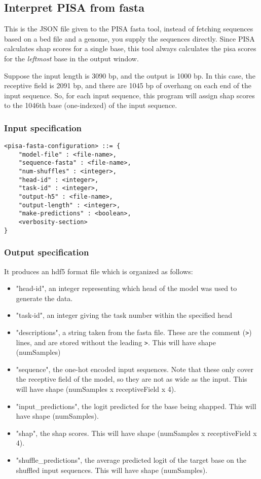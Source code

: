 \documentclass{article}
\begin{document}
\subsection{Interpret PISA from fasta}

This is the JSON file given to the PISA fasta tool, instead of fetching sequences based on a bed file and a genome, you supply the sequences directly. 
Since PISA calculates shap scores for a single base, this tool always calculates the pisa scores for the \emph{leftmost} base in the output window. 

Suppose the input length is 3090 bp, and the output is 1000 bp. 
In this case, the receptive field is 2091 bp, and there are 1045 bp of overhang on each end of the input sequence.
So, for each input sequence, this program will assign shap scores to the 1046th base (one-indexed) of the input sequence. 

\subsubsection{Input specification}
\begin{lstlisting}
<pisa-fasta-configuration> ::= {
    "model-file" : <file-name>,
    "sequence-fasta" : <file-name>,
    "num-shuffles" : <integer>,
    "head-id" : <integer>,
    "task-id" : <integer>,
    "output-h5" : <file-name>,
    "output-length" : <integer>,
    "make-predictions" : <boolean>,
    <verbosity-section>
}
\end{lstlisting}

\subsubsection{Output specification}

It produces an hdf5 format file which is organized as follows:

\begin{itemize}
    \item "head-id", an integer representing which head of the model was used to generate the data.
    \item "task-id", an integer giving the task number within the specified head
    \item "descriptions", a string taken from the fasta file. These are the comment (\texttt{>}) lines, and are stored without the leading \texttt{>}. This will have shape (numSamples)
    \item "sequence", the one-hot encoded input sequences. Note that these only cover the receptive field of the model, so they are not as wide as the input. This will have shape (numSamples x receptiveField x 4).
    \item "input\_predictions", the logit predicted for the base being shapped. This will have shape (numSamples).
    \item "shap", the shap scores. This will have shape (numSamples x receptiveField x 4). 
    \item "shuffle\_predictions", the average predicted logit of the target base on the shuffled input sequences. This will have shape (numSamples). 
\end{itemize}
\end{document}
